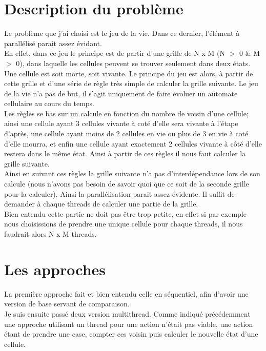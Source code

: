 \documentclass[10pt,a4paper]{article}
\begin{document}
\section{Description du problème}

\indent Le problème que j'ai choisi est le jeu de la vie. Dans ce dernier, l'élément à parallélisé parait assez évidant. \\
En effet, dans ce jeu le principe est de partir d'une grille de N x M (N $>$ 0 \& M $>$ 0), dans laquelle les cellules peuvent se trouver seulement dans deux états. Une cellule est soit morte, soit vivante. 
Le principe du jeu est alors, à partir de cette grille et d'une série de règle très simple de calculer la grille suivante.
Le jeu de la vie n'a pas de but, il s'agit uniquement de faire évoluer un automate cellulaire au cours du temps.\\

Les règles se bas sur un calcule en fonction du nombre de voisin d'une cellule; ainsi une cellule ayant 3 cellules vivante à coté d'elle sera vivante à l'étape d'après, une cellule ayant moins de 2 cellules en vie ou plus de 3 en vie à coté d'elle mourra, et enfin une cellule ayant exactement 2 cellules vivante à côté d'elle restera dans le même état. Ainsi à partir de ces règles il nous faut calculer la grille suivante. \\

Ainsi en suivant ces règles la grille suivante n'a pas d'interdépendance lors de son calcule (nous n'avons pas besoin de savoir quoi que ce soit de la seconde grille pour la calculer). Ainsi la parallélisation parait assez évidente. Il suffit de demander à chaque threads de calculer une partie de la grille. \\
Bien entendu cette partie ne doit pas être trop petite, en effet si par exemple nous choisissions de prendre une unique cellule pour chaque threads, il nous faudrait alors N x M threads.

\section{Les approches}
La première approche fait et bien entendu celle en séquentiel, afin d'avoir une version de base servant de comparaison. \\

Je suis ensuite passé deux version multithread. Comme indiqué précédemment une approche utilisant un thread pour une action n'était pas viable, une action étant de prendre une case, compter ces voisin puis calculer le nouvelle état d'une cellule. \\
\end{document}
